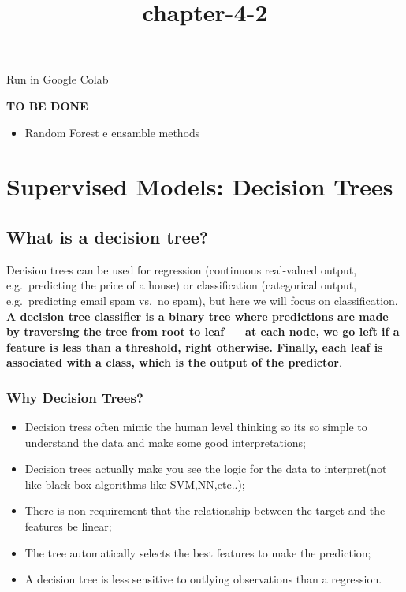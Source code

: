 \documentclass[11pt]{article}
\title{chapter-4-2}
\providecommand{\tightlist}{%
      \setlength{\itemsep}{0pt}\setlength{\parskip}{0pt}}
\begin{document}
    
    \maketitle
    
    

    
    Run in Google Colab

    \textbf{TO BE DONE}

\begin{itemize}
\tightlist
\item
  Random Forest e ensamble methods
\end{itemize}

    \hypertarget{supervised-models-decision-trees}{%
\section{Supervised Models: Decision
Trees}\label{supervised-models-decision-trees}}

    \hypertarget{what-is-a-decision-tree}{%
\subsection{What is a decision tree?}\label{what-is-a-decision-tree}}

Decision trees can be used for regression (continuous real-valued
output, e.g.~predicting the price of a house) or classification
(categorical output, e.g.~predicting email spam vs.~no spam), but here
we will focus on classification. \textbf{A decision tree classifier is a
binary tree where predictions are made by traversing the tree from root
to leaf --- at each node, we go left if a feature is less than a
threshold, right otherwise. Finally, each leaf is associated with a
class, which is the output of the predictor}.

\hypertarget{why-decision-trees}{%
\subsubsection{Why Decision Trees?}\label{why-decision-trees}}

\begin{itemize}
\item
  Decision tress often mimic the human level thinking so its so simple
  to understand the data and make some good interpretations;
\item
  Decision trees actually make you see the logic for the data to
  interpret(not like black box algorithms like SVM,NN,etc..);
\item
  There is non requirement that the relationship between the target and
  the features be linear;
\item
  The tree automatically selects the best features to make the
  prediction;
\item
  A decision tree is less sensitive to outlying observations than a
  regression.
\end{itemize}
\end{document}
